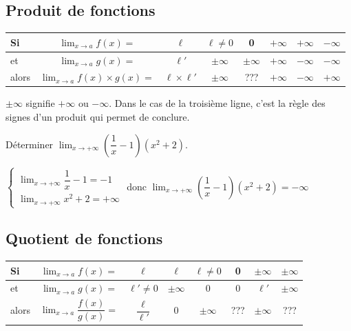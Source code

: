 \documentclass[french]{book}
\newcommand{\ds}{\displaystyle}
\newcommand{\limite}[2][x]{\ds\lim_{#1\rightarrow #2}}
\newcommand{\limpinf}[1][x]{\ds\lim_{#1\rightarrow +\infty}}
\renewcommand{\arraystretch}{1.2}
\begin{document}
\subsection{Produit de fonctions}
\begin{center}
\renewcommand{\arraystretch}{2}
\begin{tabular}{|lc|c|c|c|c|c|c|} \hline
Si & $\limite[x]{a}f(x)=$ & $\ell$ & $\ell\neq0$ & 0 & $+\infty$ & $+\infty$ & $-\infty$ \\ \hline
et & $\limite[x]{a}g(x)=$ & $\ell'$ & $\pm\infty$ & $\pm\infty$ & $+\infty$ & $-\infty$ & $-\infty$ \\ \hline
alors & $\limite[x]{a}f(x)\times g(x)=$ & $\ell\times \ell'$ & $\pm\infty$ & ??? & $+\infty$ & $-\infty$ & $+\infty$ \\ \hline
\end{tabular}
\end{center}

\begin{rem}
$\pm\infty$ signifie $+\infty$ ou $-\infty$. Dans le cas de la troisi\`eme ligne, c'est la r\`egle des signes d'un produit qui permet de conclure.
\end{rem}

\begin{exemple}
D\'eterminer $\limpinf \left(\dfrac{1}{x}-1\right)(x^{2}+2)$.
\end{exemple}


$\left\lbrace
\begin{array}{l}
\limpinf \dfrac{1}{x}-1=-1 \\
\limpinf x^{2}+2=+\infty
\end{array}
\right.$
donc $\limpinf \left(\dfrac{1}{x}-1\right)(x^{2}+2)=-\infty$


\subsection{Quotient de fonctions}
\begin{center}
\renewcommand{\arraystretch}{2}
\begin{tabular}{|lc|c|c|c|c|c|c|} \hline
Si & $\limite[x]{a}f(x)=$ & $\ell$ & $\ell$ & $\ell\neq0$ & 0 & $\pm\infty$ & $\pm\infty$ \\ \hline
et & $\limite[x]{a}g(x)=$ & $\ell'\neq0$ & $\pm\infty$ & 0 & 0 & $\ell'$ & $\pm\infty$ \\ \hline
alors & $\limite[x]{a}\dfrac{f(x)}{g(x)}=$ & $\dfrac{\ell}{\ell'}$ & 0 & $\pm\infty$ & ??? & $\pm\infty$ & ??? \\ \hline
\end{tabular}
\end{center}
\end{document}
